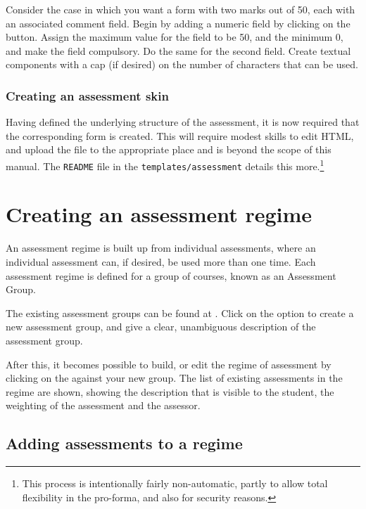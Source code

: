 \documentclass[12 pt]{book}
\begin{document}
Consider the case in which you want a form with two marks out of 50,
each with
an associated comment field. Begin by adding a numeric field by clicking
on the  button. Assign the maximum value for the field
to be 50, and the minimum 0, and make the field compulsory. Do the same
for the second field. Create textual components with a cap (if desired)
on the number of characters that can be used.

\subsubsection{Creating an assessment skin}

Having defined the underlying structure of the assessment, it is now
required that the corresponding form is created. This will require
modest skills to edit HTML, and upload the file to the appropriate place
and is beyond the scope of this manual. The \lstinline!README! file in the
\lstinline!templates/assessment! details this more.\footnote
{This process is intentionally fairly non-automatic, partly to allow
total flexibility in the pro-forma, and also for security reasons.}

\section{Creating an assessment regime}

An assessment regime is built up from individual assessments, where an
individual assessment can, if desired, be used more than one time. Each
assessment regime is defined for a group of courses, known as an 
Assessment Group.

The existing assessment groups can be found at
. Click on the
 option to create a new assessment group, and
give a clear, unambiguous description of the assessment group.

After this, it becomes possible to build, or edit the regime of assessment
by clicking on the  against your new group. The list
of existing assessments in the regime are shown, showing the description
that is visible to the student, the weighting of the assessment and the
assessor.


\subsection{Adding assessments to a regime}
\end{document}
